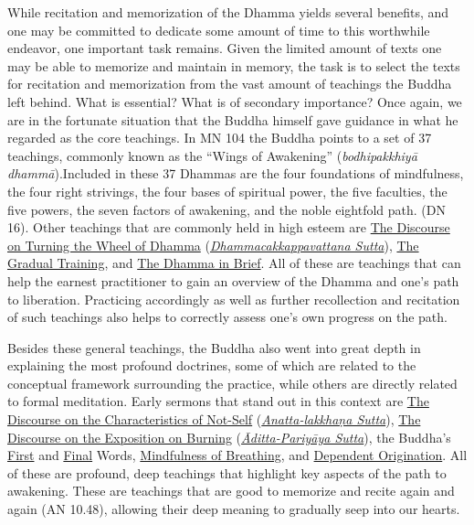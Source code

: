 While recitation and memorization of the Dhamma yields several benefits, and one may be committed to dedicate some amount of time to this worthwhile endeavor, one important task remains. Given the limited amount of texts one may be able to memorize and maintain in memory, the task is to select the texts for recitation and memorization from the vast amount of teachings the Buddha left behind. What is essential? What is of secondary importance? Once again, we are in the fortunate situation that the Buddha himself gave guidance in what he regarded as the core teachings. In MN 104 the Buddha points to a set of 37 teachings, commonly known as the ``Wings of Awakening'' (\textit{bodhipakkhiyā dhammā}).\ifbfive\clearpage\fi Included in these 37 Dhammas are the four foundations of mindfulness, the four right strivings, the four bases of spiritual power, the five faculties, the five powers, the seven factors of awakening, and the noble eightfold path. (DN 16). Other teachings that are commonly held in high esteem are \hyperref[wheel-of-dhamma-full]{The Discourse on Turning the Wheel of Dhamma} (\hyperref[dhammacakkappavattana-full]{\textit{Dhammacakkappavattana Sutta}}), \hyperref[gradual-training]{The Gradual Training}, and \hyperref[dhamma-in-brief]{The Dhamma in Brief}. All of these are teachings that can help the earnest practitioner to gain an overview of the Dhamma and one's path to liberation. Practicing accordingly as well as further recollection and recitation of such teachings also helps to correctly assess one's own progress on the path.

Besides these general teachings, the Buddha also went into great depth in explaining the most profound doctrines, some of which are related to the conceptual framework surrounding the practice, while others are directly related to formal meditation. Early sermons that stand out in this context are \hyperref[characteristic-of-not-self]{The Discourse on the Characteristics of Not-Self} (\hyperref[anatta-lakkhana]{\textit{Anatta-lakkhaṇa Sutta}}), \hyperref[exposition-on-burning]{The Discourse on the Exposition on Burning} (\hyperref[aditta-pariyaya]{\textit{Āditta-Pariyāya Sutta}}), the Buddha's \hyperref[buddhas-first-exclamation]{First} and \hyperref[buddhas-final-instruction]{Final} Words, \hyperref[mindfulness-of-breathing]{Mindfulness of Breathing}, and \hyperref[dependent-origination]{Dependent Origination}. All of these are profound, deep teachings that highlight key aspects of the path to awakening. These are teachings that are good to memorize and recite again and again (AN 10.48), allowing their deep meaning to gradually seep into our hearts.

